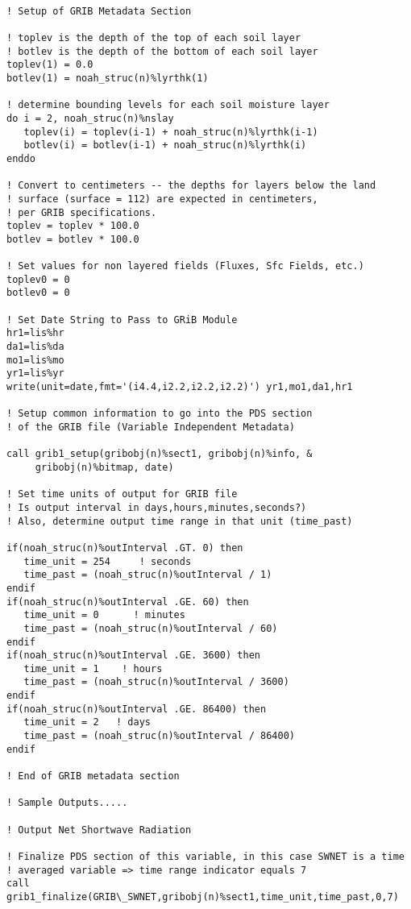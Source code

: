 \begin{verbatim}

! Setup of GRIB Metadata Section

! toplev is the depth of the top of each soil layer
! botlev is the depth of the bottom of each soil layer
toplev(1) = 0.0
botlev(1) = noah_struc(n)%lyrthk(1)

! determine bounding levels for each soil moisture layer
do i = 2, noah_struc(n)%nslay
   toplev(i) = toplev(i-1) + noah_struc(n)%lyrthk(i-1)
   botlev(i) = botlev(i-1) + noah_struc(n)%lyrthk(i)
enddo

! Convert to centimeters -- the depths for layers below the land
! surface (surface = 112) are expected in centimeters,
! per GRIB specifications.
toplev = toplev * 100.0
botlev = botlev * 100.0

! Set values for non layered fields (Fluxes, Sfc Fields, etc.)
toplev0 = 0
botlev0 = 0

! Set Date String to Pass to GRiB Module
hr1=lis%hr
da1=lis%da
mo1=lis%mo
yr1=lis%yr
write(unit=date,fmt='(i4.4,i2.2,i2.2,i2.2)') yr1,mo1,da1,hr1

! Setup common information to go into the PDS section
! of the GRIB file (Variable Independent Metadata)

call grib1_setup(gribobj(n)%sect1, gribobj(n)%info, &
     gribobj(n)%bitmap, date)

! Set time units of output for GRIB file
! Is output interval in days,hours,minutes,seconds?)
! Also, determine output time range in that unit (time_past)

if(noah_struc(n)%outInterval .GT. 0) then
   time_unit = 254     ! seconds
   time_past = (noah_struc(n)%outInterval / 1)
endif
if(noah_struc(n)%outInterval .GE. 60) then
   time_unit = 0      ! minutes
   time_past = (noah_struc(n)%outInterval / 60)
endif
if(noah_struc(n)%outInterval .GE. 3600) then
   time_unit = 1    ! hours
   time_past = (noah_struc(n)%outInterval / 3600)
endif
if(noah_struc(n)%outInterval .GE. 86400) then
   time_unit = 2   ! days
   time_past = (noah_struc(n)%outInterval / 86400)
endif

! End of GRIB metadata section

! Sample Outputs.....

! Output Net Shortwave Radiation

! Finalize PDS section of this variable, in this case SWNET is a time
! averaged variable => time range indicator equals 7
call grib1_finalize(GRIB\_SWNET,gribobj(n)%sect1,time_unit,time_past,0,7)


\end{verbatim}
